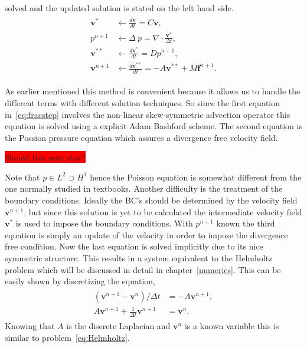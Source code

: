 solved and the updated solution is stated on the left hand side.
\begin{align}
    \begin{split}
        \mathbf{v}^* &\leftarrow \frac{d\mathbf{v}}{dt}=C\mathbf{v},\\
    p^{n+1} &\leftarrow \Delta\: p = \nabla \cdot \frac{\mathbf{v}^*}{\Delta t},\\
    \mathbf{v}^{**} &\leftarrow  \frac{d\mathbf{v}^*}{dt} =Dp^{n+1},\\
    \mathbf{v}^{n+1} &\leftarrow \frac{d\mathbf{v}^{**}}{dt}= -A\mathbf{v}^{**}+M\mathbf{f}^{n+1}.
    \end{split}
    \label{eq:fracstep}
\end{align}

As earlier mentioned this method is convenient because it allows us to handle the different 
terms with different solution techniques. So since the first equation in~\ref{eq:fracstep}
involves the non-linear skew-symmetric advection operator this equation is solved using a 
explicit Adam Bashford scheme. The second equation is the Possion pressure equation which
assures a divergence free velocity field. 

\colorbox{red}{Should this note stay?}

Note that $p\in L^2\supset H^1$ hence the Poisson equation 
is somewhat different from the one normally studied in textbooks. Another difficulty is the 
treatment of the boundary conditions. Ideally the BC's should be determined by the velocity 
field $\mathbf{v}^{n+1}$, but since this solution is yet to be calculated the intermediate velocity field 
$\mathbf{v}^{*}$ is used to impose the boundary conditions. With $p^{n+1}$ known the third equation is 
simply an update of the velocity in order to impose the divergence free condition. Now the last
equation is solved implicitly due to its nice symmetric structure. This results in a system 
equivalent to the Helmholtz problem which will be discussed in detail in chapter~\ref{numerics}.
This can be easily shown by discretizing the equation, 
\begin{align}
    \begin{split}
    (\mathbf{v}^{n+1}-\mathbf{v}^{n})/\Delta t  &= -A\mathbf{v}^{n+1},\\
    A\mathbf{v}^{n+1}+\frac{1}{\Delta t} \mathbf{v}^{n+1} &= \mathbf{v}^{n}.
    \end{split}
    \label{eq:fracHelm}
\end{align}
Knowing that $A$ is the discrete Laplacian and $\mathbf{v}^n$ is a known variable this is 
similar to problem~\ref{eq:Helmholtz}.


